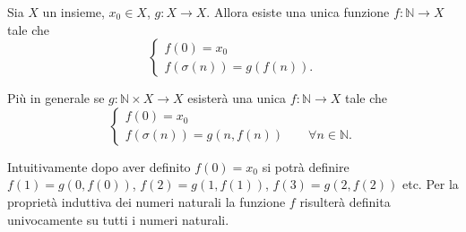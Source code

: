 \documentclass[italian,a4paper,twosides,headinclude]{scrbook}
\newcommand{\NN}{\mathbb N}
\begin{document}
\begin{theorem}%
\label{th:def_induction}
Sia $X$ un insieme, $x_0 \in X$, $g\colon X \to X$. Allora esiste una unica funzione $f\colon \NN \to X$ tale che
\[
  \begin{cases}
    f(0) = x_0 \\
    f(\sigma(n)) = g(f(n)).
  \end{cases}
\]

Più in generale se $g\colon \NN \times X \to X$
esisterà una unica $f\colon \NN \to X$ tale che
\begin{equation}\label{eq:def_induction_non_auto}
\begin{cases}
  f(0) = x_0 \\
  f(\sigma(n)) = g(n, f(n)) \qquad \forall n\in \NN.
\end{cases}
\end{equation}
\end{theorem}

Intuitivamente dopo aver definito $f(0) = x_0$ si potrà definire
$f(1) = g(0, f(0))$, $f(2) = g(1, f(1))$, $f(3) = g(2, f(2))$ etc.
Per la proprietà induttiva dei numeri naturali la funzione $f$ risulterà
definita univocamente su tutti i numeri naturali.
\end{document}
